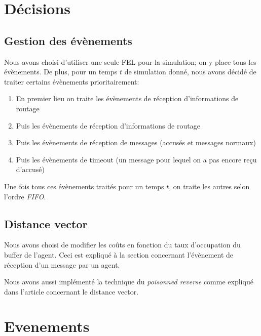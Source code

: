\documentclass[a4paper,11pt]{article}
\begin{document}

\tableofcontents %
\listoffigures %
\lstlistoflistings
\pagebreak




\section{Décisions}

\subsection{Gestion des évènements}
Nous avons choisi d'utiliser une seule FEL pour la simulation; on y place tous les évènements. De plus, pour un temps $t$ de simulation donné, nous avons décidé de traiter certains évènements prioritairement:

\begin{enumerate}
 \item En premier lieu on traite les évènements de réception d'informations de routage
 \item Puis les évènements de réception d'informations de routage
 \item Puis les évènements de réception de messages (accusés et messages normaux)
 \item Puis les évènements de timeout (un message pour lequel on a pas encore reçu d'accusé)
\end{enumerate}

Une fois tous ces évènements traités pour un temps $t$, on traite les autres selon l'ordre \textit{FIFO}.

\subsection{Distance vector}
Nous avons choisi de modifier les coûts en fonction du taux d'occupation du buffer de l'agent. Ceci est expliqué à la section  concernant l'évènement de réception d'un message par un agent.

Nous avons aussi implémenté la technique du \textit{poisonned reverse} comme expliqué dans l'article concernant le distance vector.








\section{Evenements}
\end{document}

